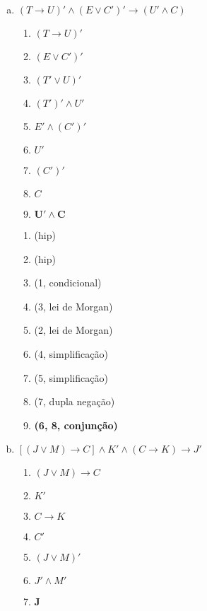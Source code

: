 \begin{Gabarito}{12}
\begin{enumerate}[a)]
\begin{multicols}{2}
      \end{multicols}

      \item $(T \rightarrow U)' \land (E \lor C')' \rightarrow (U' \land C)$ \\
      \begin{multicols}{2}

        \begin{enumerate}[1.]
          \item $(T \rightarrow U)'$
          \item $(E \lor C')'$
          \item $(T' \lor U)'$
          \item $(T')' \land U'$
          \item $E' \land (C')'$
          \item $U'$
          \item $(C')'$
          \item $C$
          \item $\boldsymbol{U' \land C}$
        \end{enumerate}

        \columnbreak

        \begin{enumerate}[\ding{32}]
          \item (hip)
          \item (hip)
          \item (1, condicional)
          \item (3, lei de Morgan)
          \item (2, lei de Morgan)
          \item (4, simplificação)
          \item (5, simplificação)
          \item (7, dupla negação)
          \item \textbf{(6, 8, conjunção)}
        \end{enumerate}

      \end{multicols}

      \item $[(J \lor M) \rightarrow C] \land K' \land (C \rightarrow K) \rightarrow J'$
      \begin{multicols}{2}

        \begin{enumerate}[1.]
          \item $(J \lor M) \rightarrow C$
          \item $K'$
          \item $C \rightarrow K$
          \item $C'$
          \item $(J \lor M)'$
          \item $J' \land M'$
          \item $\boldsymbol{J}$
        \end{enumerate}


\end{multicols}
\end{enumerate}
\end{Gabarito}
